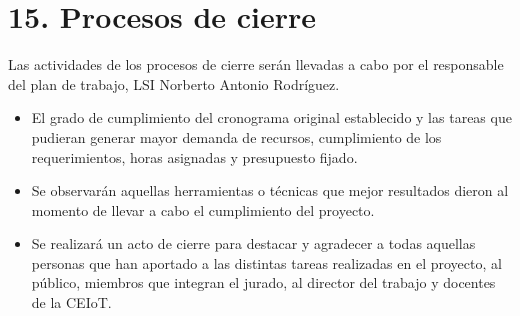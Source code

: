 \documentclass[
11pt, %
]{charter}
\begin{document}


\section{15. Procesos de cierre}    
\label{sec:cierre}

Las actividades de los procesos de cierre serán llevadas a cabo por el responsable del plan de trabajo, LSI Norberto Antonio Rodríguez.

\begin{itemize}
	\item El grado de cumplimiento del cronograma original establecido y las tareas que pudieran generar mayor demanda de recursos, cumplimiento de los requerimientos, horas asignadas y presupuesto fijado.
	 
	\item Se observarán aquellas herramientas o técnicas que mejor resultados dieron al momento de llevar a cabo el cumplimiento del proyecto.
	
	\item Se realizará un acto de cierre para destacar y agradecer a todas aquellas personas que han aportado a las distintas tareas realizadas en el proyecto, al público, miembros que integran el jurado, al director del trabajo y docentes de la CEIoT.
\end{itemize}

\end{document}
